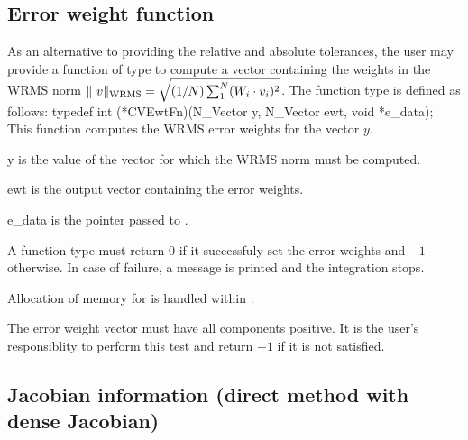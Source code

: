 \subsection{Error weight function}
\label{ss:ewtsetFn}
As an alternative to providing the relative and absolute tolerances, the user may
provide a function of type  to compute a vector  containing the
weights in the WRMS norm 
$\|\ v \|_{\mbox{\scriptsize WRMS}} = \sqrt{(1/N)\sum_1^N (W_i \cdot v_i)^2}$.
The function type  is defined as follows:
{
  typedef int (*CVEwtFn)(N\_Vector y, N\_Vector ewt, void *e\_data);
}
{
  This function computes the WRMS error weights for the vector $y$.
}
{
  \begin{args}[e\_data]
  \item[y]
    is the value of the vector for which the WRMS norm must be computed.
  \item[ewt]
    is the output vector containing the error weights.
  \item[e\_data]
    is the       
    pointer passed to .   
  \end{args}
}
{
  A  function type must return $0$ if it successfuly set
  the error weights and $-1$ otherwise. In case of failure, a message is printed
  and the integration stops.
}
{
  Allocation of memory for  is handled within {\cvodes}.

  {\warn}The error weight vector must have all components positive. It is the
  user's responsiblity to perform this test and return $-1$ if it is not 
  satisfied.
}

\subsection{Jacobian information (direct method with dense Jacobian)}
\label{ss:djacFn}

